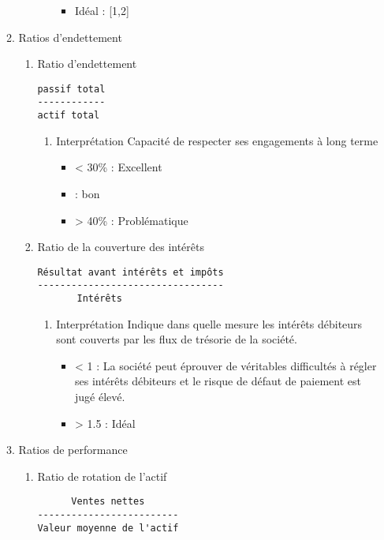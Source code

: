 \documentclass[11pt]{article}
\begin{document}
\begin{enumerate}
\begin{enumerate}
\begin{enumerate}
\begin{enumerate}
\begin{itemize}
\item Idéal : [1,2]
\end{itemize}
\end{enumerate}
\end{enumerate}
\item Ratios d'endettement
\label{sec:orgbd2c2de}
\begin{enumerate}
\item Ratio d'endettement
\label{sec:orgbb03f09}
\begin{verbatim}
passif total
------------
actif total
\end{verbatim}
\begin{enumerate}
\item Interprétation
\label{sec:org7344ec4}
Capacité de respecter ses engagements à long terme
\begin{itemize}
\item < 30\% : Excellent
\item\relax [30\%, 36\%] : bon
\item > 40\% : Problématique
\end{itemize}
\end{enumerate}
\item Ratio de la couverture des intérêts
\label{sec:orgba87966}
\begin{verbatim}
Résultat avant intérêts et impôts
---------------------------------
       Intérêts
\end{verbatim}
\begin{enumerate}
\item Interprétation
\label{sec:orgd6a664c}
Indique dans quelle mesure les intérêts débiteurs sont couverts par les flux de
trésorie de la société.
\begin{itemize}
\item < 1 : La société peut éprouver de véritables difficultés à régler ses intérêts
débiteurs et le risque de défaut de paiement est jugé élevé.
\item > 1.5 : Idéal
\end{itemize}
\end{enumerate}
\end{enumerate}
\item Ratios de performance
\label{sec:org8712864}
\begin{enumerate}
\item Ratio de rotation de l'actif
\label{sec:orgd2f2863}
\begin{verbatim}
      Ventes nettes
-------------------------
Valeur moyenne de l'actif


\end{verbatim}
\end{enumerate}
\end{enumerate}
\end{enumerate}
\end{document}
